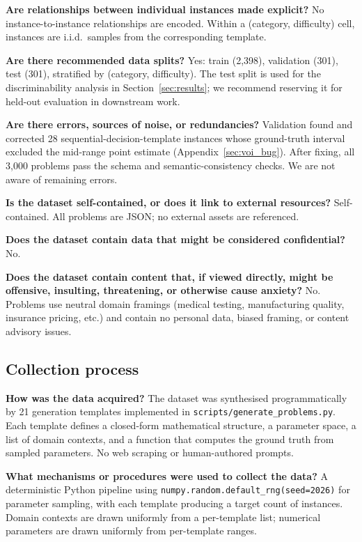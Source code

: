 \documentclass{article}
\begin{document}
\textbf{Are relationships between individual instances made explicit?}
No instance-to-instance relationships are encoded. Within a (category, difficulty) cell, instances are i.i.d.\ samples from the corresponding template.

\textbf{Are there recommended data splits?}
Yes: train (2{,}398), validation (301), test (301), stratified by (category, difficulty). The test split is used for the discriminability analysis in Section~\ref{sec:results}; we recommend reserving it for held-out evaluation in downstream work.

\textbf{Are there errors, sources of noise, or redundancies?}
Validation found and corrected 28 sequential-decision-template instances whose ground-truth interval excluded the mid-range point estimate (Appendix~\ref{sec:voi_bug}). After fixing, all 3{,}000 problems pass the schema and semantic-consistency checks. We are not aware of remaining errors.

\textbf{Is the dataset self-contained, or does it link to external resources?}
Self-contained. All problems are JSON; no external assets are referenced.

\textbf{Does the dataset contain data that might be considered confidential?}
No.

\textbf{Does the dataset contain content that, if viewed directly, might be offensive, insulting, threatening, or otherwise cause anxiety?}
No. Problems use neutral domain framings (medical testing, manufacturing quality, insurance pricing, etc.) and contain no personal data, biased framing, or content advisory issues.

\subsection*{Collection process}

\textbf{How was the data acquired?}
The dataset was synthesised programmatically by 21 generation templates implemented in \texttt{scripts/generate\_problems.py}. Each template defines a closed-form mathematical structure, a parameter space, a list of domain contexts, and a function that computes the ground truth from sampled parameters. No web scraping or human-authored prompts.

\textbf{What mechanisms or procedures were used to collect the data?}
A deterministic Python pipeline using \texttt{numpy.random.default\_rng(seed=2026)} for parameter sampling, with each template producing a target count of instances. Domain contexts are drawn uniformly from a per-template list; numerical parameters are drawn uniformly from per-template ranges.
\end{document}
